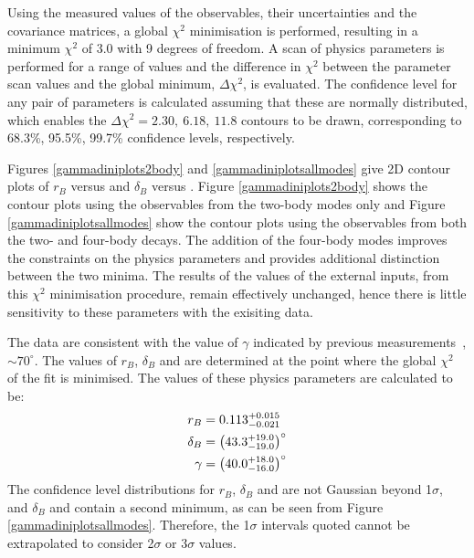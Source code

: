 Using the measured values of the \CP observables, their uncertainties and the covariance matrices, a global $\chi^2$ minimisation is performed, resulting in a minimum $\chi^2$ of 3.0 with 9 degrees of freedom. A scan of physics parameters is performed for a range of values and the difference in $\chi^2$ between the parameter scan values and the global minimum, $\Delta\chi^2$, is evaluated. The confidence level for any pair of parameters is calculated assuming that these are normally distributed, which enables the $\Delta \chi^2 = 2.30,\ 6.18,\ 11.8$ contours to be drawn, corresponding to 68.3\%, 95.5\%, 99.7\% confidence levels, respectively. 

Figures \ref{gammadiniplots2body} and \ref{gammadiniplotsallmodes} give 2D contour plots of $r_B$ versus \Pgamma and $\delta_B$ versus \Pgamma. Figure \ref{gammadiniplots2body} shows the contour plots using the \CP observables from the two-body modes only and Figure \ref{gammadiniplotsallmodes} show the contour plots using the \CP observables from both the two- and four-body decays. The addition of the four-body modes improves the constraints on the physics parameters and provides additional distinction between the two minima. The results of the values of the external inputs, from this $\chi^2$ minimisation procedure, remain effectively unchanged, hence there is little sensitivity to these parameters with the exisiting data.

The data are consistent with the value of $\gamma$ indicated by previous measurements~\cite{LHCb-PAPER-2016-032, CKMFitter}, $\sim 70^\circ$. The values of $r_B$, $\delta_B$ and \Pgamma are determined at the point where the global $\chi^2$ of the fit is minimised. The values of these physics parameters are calculated to be:
\begin{align*}
r_B &= 0.113^{+0.015}_{-0.021} \\
\delta_B &= \left(43.3^{+19.0}_{-19.0}\right)^{\circ} \\
\gamma &= \left(40.0^{+18.0}_{-16.0}\right)^{\circ} 
\end{align*}
The confidence level distributions for $r_B$, $\delta_B$ and \Pgamma are not Gaussian beyond 1$\sigma$, and $\delta_B$ and \Pgamma contain a second minimum, as can be seen from Figure \ref{gammadiniplotsallmodes}. Therefore, the 1$\sigma$ intervals quoted cannot be extrapolated to consider 2$\sigma$ or 3$\sigma$ values. 

